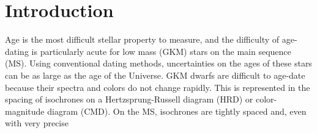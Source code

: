 \section{Introduction}
\label{section:intro}

Age is the most difficult stellar property to measure, and the difficulty of
age-dating is particularly acute for low mass (GKM) stars on the main sequence
(MS).
Using conventional dating methods, uncertainties on the ages of these stars
can be as large as the age of the Universe.
GKM dwarfs are difficult to age-date because their spectra and colors do not
change rapidly.
This is represented in the spacing of isochrones on a Hertzsprung-Russell
diagram (HRD) or color-magnitude diagram (CMD).
On the MS, isochrones are tightly spaced and, even with very precise
